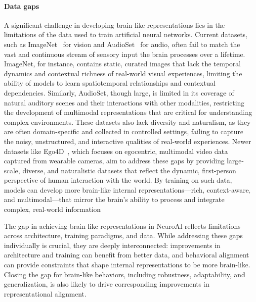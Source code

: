 \paragraph{Data gaps}
A significant challenge in developing brain-like representations lies in the limitations of the data used to train artificial neural networks. Current datasets, such as ImageNet~\citep{Deng2009} for vision and AudioSet~\citep{gemmeke2017audio} for audio, often fail to match the vast and continuous stream of sensory input the brain processes over a lifetime. ImageNet, for instance, contains static, curated images that lack the temporal dynamics and contextual richness of real-world visual experiences, limiting the ability of models to learn spatiotemporal relationships and contextual dependencies. Similarly, AudioSet, though large, is limited in its coverage of natural auditory scenes and their interactions with other modalities, restricting the development of multimodal representations that are critical for understanding complex environments. These datasets also lack diversity and naturalism, as they are often domain-specific and collected in controlled settings, failing to capture the noisy, unstructured, and interactive qualities of real-world experiences. Newer datasets like Ego4D~\citep{grauman2022ego4d}, which focuses on egocentric, multimodal video data captured from wearable cameras, aim to address these gaps by providing large-scale, diverse, and naturalistic datasets that reflect the dynamic, first-person perspective of human interaction with the world. By training on such data, models can develop more brain-like internal representations---rich, context-aware, and multimodal---that mirror the brain’s ability to process and integrate complex, real-world information

The gap in achieving brain-like representations in NeuroAI reflects limitations across architecture, training paradigms, and data. While addressing these gaps individually is crucial, they are deeply interconnected: improvements in architecture and training can benefit from better data, and behavioral alignment can provide constraints that shape internal representations to be more brain-like. Closing the gap for brain-like behaviors, including robustness, adaptability, and generalization, is also likely to drive corresponding improvements in representational alignment. 


